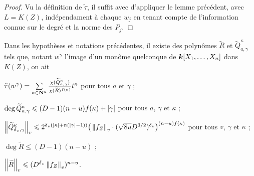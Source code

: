 \documentclass{mpg-preth}
\begin{document}
\begin{proof}
  Vu la définition de $\tilde\tau$, il suffit avec d'appliquer le lemme
  précédent, avec $L = K(Z)$, indépendament à chaque $w_j$ en tenant compte de
  l'information connue sur le degré et la norme des $P_j$.
\end{proof}

\begin{lem}
  Dans les hypothèses et notations précédentes, il existe des polynômes
  $\widetilde R$ et $\widetilde Q_{a, \gamma}^\kappa$ tels que, notant
  $w^\gamma$ l'image d'un monôme quelconque de $\boldsymbol{k}[X_1, \ldots, X_n]$ dans
  $K(Z)$, on ait
  \begin{enumthm}
    \item $\tilde\tau(w^\gamma) = \sum\limits_{\kappa\in\mathbf{N}^u}
      \frac
        {\chi(\widetilde Q_{a, \gamma}^\kappa)}
        {\chi(\widetilde R)^{f(\kappa)}}
      t^\kappa$ pour tous $a$ et $\gamma$ ;
    \item $\deg \widetilde Q_{a, \gamma}^\kappa \leqslant (D-1)(n-u)f(\kappa) +
      \left\lvert\gamma\right\rvert$ pour tous $a$, $\gamma$ et $\kappa$ ;
    \item $\left\lVert\widetilde Q_{{\delta\smash{_v}}, \gamma}^\kappa\right\rVert_{v} \leqslant 2^{{\delta\smash{_v}}(\left\lvert\kappa\right\rvert +
        n(\left\lvert\gamma\right\rvert -1))} \big( \left\lVert f_Z\right\rVert_{v} \cdot (\sqrt{8u} D^{3/2})^{\delta\smash{_v}}
      \big)^{(n-u)f(\kappa)}$ pour tous $v$, $\gamma$ et $\kappa$ ;
    \item $\deg{\widetilde R} \le (D-1)(n-u)$ ;
    \item $\left\lVert\widetilde R\right\rVert_{v} \leqslant (D^{\delta\smash{_v}} \left\lVert f_Z\right\rVert_{v})^{n-u}$.
  \end{enumthm}
\end{lem}
\end{document}
